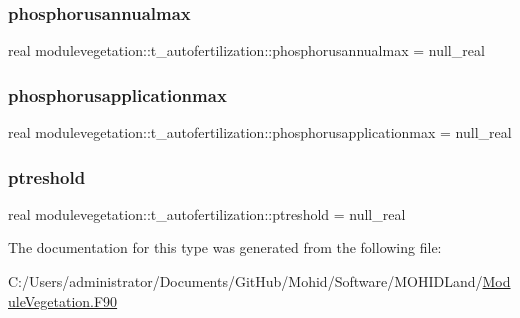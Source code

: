 \subsubsection{\texorpdfstring{phosphorusannualmax}{phosphorusannualmax}}
{\footnotesize\ttfamily real modulevegetation\+::t\+\_\+autofertilization\+::phosphorusannualmax = null\+\_\+real\hspace{0.3cm}{\ttfamily [private]}}

\mbox{\label{structmodulevegetation_1_1t__autofertilization_aaae7f970eb92b58f7f77dce81a27ab64}} 
\subsubsection{\texorpdfstring{phosphorusapplicationmax}{phosphorusapplicationmax}}
{\footnotesize\ttfamily real modulevegetation\+::t\+\_\+autofertilization\+::phosphorusapplicationmax = null\+\_\+real\hspace{0.3cm}{\ttfamily [private]}}

\mbox{\label{structmodulevegetation_1_1t__autofertilization_abe2dbd3056b66f446c8145565b2e9fdc}} 
\subsubsection{\texorpdfstring{ptreshold}{ptreshold}}
{\footnotesize\ttfamily real modulevegetation\+::t\+\_\+autofertilization\+::ptreshold = null\+\_\+real\hspace{0.3cm}{\ttfamily [private]}}



The documentation for this type was generated from the following file\+:\begin{DoxyCompactItemize}
\item 
C\+:/\+Users/administrator/\+Documents/\+Git\+Hub/\+Mohid/\+Software/\+M\+O\+H\+I\+D\+Land/\mbox{\hyperlink{_module_vegetation_8_f90}{Module\+Vegetation.\+F90}}\end{DoxyCompactItemize}
